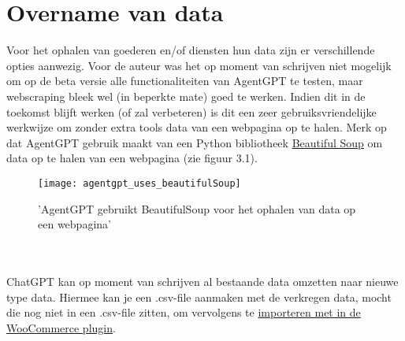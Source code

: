 \section{Overname van data}
Voor het ophalen van goederen en/of diensten hun data zijn er verschillende opties aanwezig. Voor de auteur was het op moment van schrijven niet mogelijk om op de beta versie alle functionaliteiten van AgentGPT te testen, maar webscraping bleek wel (in beperkte mate) goed te werken. Indien dit in de toekomst blijft werken (of zal verbeteren) is dit een zeer gebruiksvriendelijke werkwijze om zonder extra tools data van een webpagina op te halen. Merk op dat AgentGPT gebruik maakt van een Python bibliotheek \href{https://www.crummy.com/software/BeautifulSoup/bs4/doc/}{Beautiful Soup} om data op te halen van een webpagina (zie figuur 3.1). 
\begin{figure}
    \caption{'AgentGPT gebruikt BeautifulSoup voor het ophalen van data op een webpagina'}
    \begin{center}
        \texttt{[image: agentgpt\_uses\_beautifulSoup]}
    \end{center}
\end{figure} 
\\\\
ChatGPT kan op moment van schrijven al bestaande data omzetten naar nieuwe type data. Hiermee kan je een .csv-file aanmaken met de verkregen data, mocht die nog niet in een .csv-file zitten, om vervolgens te \href{https://woocommerce.com/document/importing-woocommerce-sample-data/}{importeren met in de WooCommerce plugin}.
